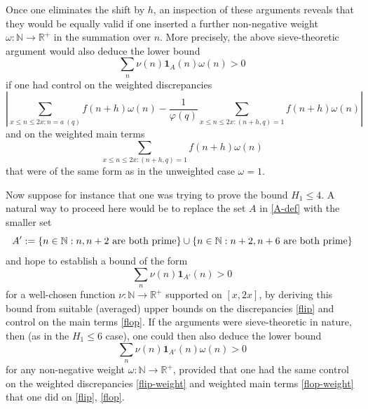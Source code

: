 \documentclass{bmcart}
\theoremstyle{plain}
\theoremstyle{definition}
\newcommand\R{\mathbb{R}}
\newcommand\N{\mathbb{N}}
\renewcommand{\phi}{\varphi}
\newcommand{\onef}{\mathbf{1}}
\begin{document}
Once one eliminates the shift by $h$, an inspection of these arguments reveals that they would be equally valid if one inserted a further non-negative weight $\omega: \N \to \R^+$ in the summation over $n$.  More precisely, the above sieve-theoretic argument would also deduce the lower bound
$$ \sum_n \nu(n) \onef_A(n) \omega(n) > 0$$
if one had control on the weighted discrepancies
\begin{equation}\label{flip-weight}
 \left|\sum_{x \leq n \leq 2x: n= a\ (q)} f(n+h) \omega(n) - \frac{1}{\phi(q)} \sum_{x \leq n \leq 2x: (n+h,q)=1} f(n+h) \omega(n)\right|
\end{equation}
and on the weighted main terms
\begin{equation}\label{flop-weight}
\sum_{x \leq n \leq 2x: (n+h,q)=1} f(n+h) \omega(n)
\end{equation}
that were of the same form as in the unweighted case $\omega=1$.

Now suppose for instance that one was trying to prove the bound $H_1 \leq 4$.  A natural way to proceed here would be to replace the set $A$ in \eqref{A-def} with the smaller set
\begin{equation}\label{app}
 A' := \{ n \in \N: n, n+2 \hbox{ are both prime} \} \cup \{ n \in \N: n+2, n+6 \hbox{ are both prime} \}
\end{equation}
and hope to establish a bound of the form
$$ \sum_n \nu(n) \onef_{A'}(n) > 0$$
for a well-chosen function $\nu: \N \to \R^+$ supported on $[x,2x]$, by deriving this bound from suitable (averaged) upper bounds on the discrepancies \eqref{flip} and control on the main terms \eqref{flop}.  If the arguments were sieve-theoretic in nature, then (as in the $H_1 \leq 6$ case), one could then also deduce the lower bound
\begin{equation}\label{ap-lower}
 \sum_n \nu(n) \onef_{A'}(n) \omega(n) > 0
\end{equation}
for any non-negative weight $\omega: \N \to \R^+$, provided that one had the same control on the weighted discrepancies \eqref{flip-weight} and weighted main terms \eqref{flop-weight} that one did on \eqref{flip}, \eqref{flop}.
\end{document}
